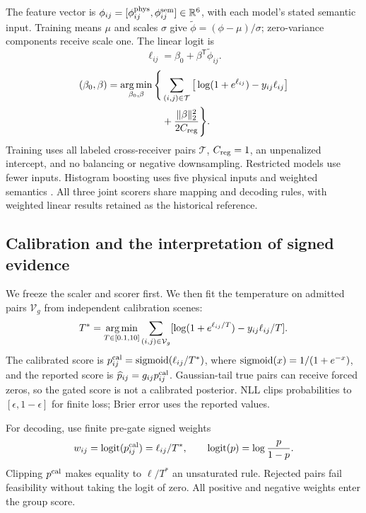 The feature vector is $\phi_{ij}=[\phi^{\mathrm{phys}}_{ij},\phi^{\mathrm{sem}}_{ij}]\in\mathbb R^6$, with each model's stated semantic input. Training means $\mu$ and scales $\sigma$ give $\widetilde\phi=(\phi-\mu)/\sigma$; zero-variance components receive scale one. The linear logit is
\begin{equation}
 \ell_{ij}=\beta_0+\beta^{\mathsf T}\widetilde\phi_{ij}.
 \label{eq:logit}
\end{equation}
\begin{equation}
 \begin{split}
 (\beta_0,\beta)=\operatorname*{arg\,min}_{\beta_0,\beta}\Bigg\{
 &\sum_{(i,j)\in\mathcal T}
 \big[\log(1+e^{\ell_{ij}})-y_{ij}\ell_{ij}\big]\\
 &+\frac{\|\beta\|_2^2}{2C_{\rm reg}}\Bigg\}.
 \end{split}\label{eq:logistic}
\end{equation}
Training uses all labeled cross-receiver pairs $\mathcal T$, $C_{\rm reg}=1$, an unpenalized intercept, and no balancing or negative downsampling. Restricted models use fewer inputs. Histogram boosting uses five physical inputs and weighted semantics \cite{sklearn}. All three joint scorers share mapping and decoding rules, with weighted linear results retained as the historical reference.

\subsection{Calibration and the interpretation of signed evidence}
We freeze the scaler and scorer first. We then fit the temperature on admitted pairs $\mathcal V_g$ from independent calibration scenes:
\begin{equation}
 T^*=\operatorname*{arg\,min}_{T\in[0.1,10]}
 \sum_{(i,j)\in\mathcal V_g}[\log(1+e^{\ell_{ij}/T})-y_{ij}\ell_{ij}/T].\label{eq:temperature}
\end{equation}
The calibrated score is $p^{\rm cal}_{ij}=\operatorname{sigmoid}(\ell_{ij}/T^*)$, where $\operatorname{sigmoid}(x)=1/(1+e^{-x})$, and the reported score is $\widehat p_{ij}=g_{ij}p^{\rm cal}_{ij}$. Gaussian-tail true pairs can receive forced zeros, so the gated score is not a calibrated posterior. NLL clips probabilities to $[\epsilon,1-\epsilon]$ for finite loss; Brier error uses the reported values.


For decoding, use finite pre-gate signed weights
\begin{equation}
 w_{ij}=\operatorname{logit}(p^{\rm cal}_{ij})=\ell_{ij}/T^*,\qquad
 \operatorname{logit}(p)=\log\frac{p}{1-p}.\label{eq:weights}
\end{equation}
Clipping $p^{\rm cal}$ makes equality to $\ell/T^*$ an unsaturated rule. Rejected pairs fail feasibility without taking the logit of zero. All positive and negative weights enter the group score.

